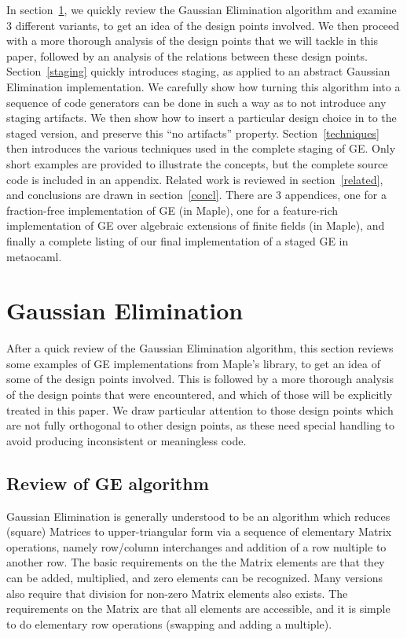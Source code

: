 \documentclass[11pt]{elsart}
\begin{document}
In section~\ref{GEintro}, we quickly review the Gaussian Elimination algorithm
and examine 3 different variants, to get an idea of the design points
involved.  We then proceed with a more thorough analysis of the design
points that we will tackle in this paper, followed by an analysis of the
relations between these design points.  Section~\ref{staging} quickly
introduces staging, as applied to an abstract Gaussian Elimination 
implementation.  We carefully show how turning this algorithm into a 
sequence of code generators can be done in such a way as to not introduce
any staging artifacts.  We then show how to insert a particular design
choice in to the staged version, and preserve this ``no artifacts''
property.  Section~\ref{techniques} then introduces the various techniques
used in the complete staging of GE.  Only short examples are provided
to illustrate the concepts, but the complete source code is included in an 
appendix.  Related work is reviewed in section~\ref{related}, and 
conclusions are drawn in section~\ref{concl}.  There are 3 appendices, 
one for a fraction-free implementation of GE (in Maple), one for a
feature-rich implementation of GE over algebraic extensions of finite
fields (in Maple), and finally a complete listing of our final implementation
of a staged GE in metaocaml.

\section{Gaussian Elimination}\label{GEintro}

After a quick review of the Gaussian Elimination algorithm, this section
reviews some examples of GE implementations from Maple's library, to get 
an idea of some of the design points involved.  This is followed by a
more thorough analysis of the design points that were encountered, and
which of those will be explicitly treated in this paper.  We draw particular
attention to those design points which are not fully orthogonal to other
design points, as these need special handling to avoid producing
inconsistent or meaningless code.

\subsection{Review of GE algorithm}

Gaussian Elimination is generally understood to be an algorithm which reduces
(square) Matrices to upper-triangular form via a sequence of elementary Matrix
operations, namely row/column interchanges and addition of a row multiple to
another row.  The basic requirements on the the Matrix elements are that they
can be added, multiplied, and zero elements can be recognized.  Many versions
also require that division for non-zero Matrix elements also exists.  The
requirements on the Matrix are that all elements are accessible, and it 
is simple to do elementary row operations (swapping and adding a multiple).
\end{document}
